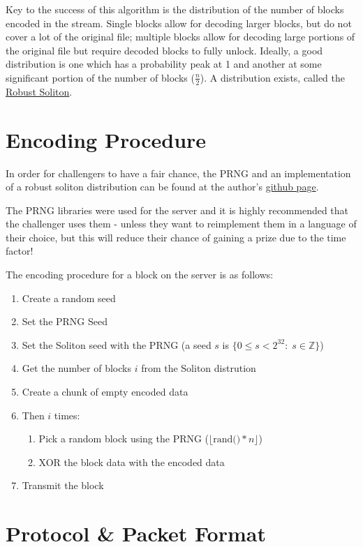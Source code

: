 \documentclass[10pt,a4paper]{article}
\begin{document}
Key to the success of this algorithm is the distribution of the number of blocks encoded in the stream.
Single blocks allow for decoding larger blocks, but do not cover a lot of the original file; multiple blocks allow for decoding large portions of the original file but require decoded blocks to fully unlock.
Ideally, a good distribution is one which has a probability peak at 1 and another at some significant portion of the number of blocks ($\frac{n}{2}$).
A distribution exists, called the \href{http://en.wikipedia.org/wiki/Soliton_distribution}{Robust Soliton}.

\section{Encoding Procedure}

In order for challengers to have a fair chance, the PRNG and an implementation of a robust soliton distribution can be found at the author's \href{http://github.com/carl-ellis/}{github page}.

The PRNG libraries were used for the server and it is highly recommended that the challenger uses them - unless they want to reimplement them in a language of their choice, but this will reduce their chance of gaining a prize due to the time factor!

The encoding procedure for a block on the server is as follows:

\begin{enumerate}
	\item Create a random seed
	\item Set the PRNG Seed
	\item Set the Soliton seed with the PRNG (a seed $s$ is $ \{ 0 \leq s < 2^{32} : \; s \in \mathbb{Z} \}$)
	\item Get the number of blocks $i$ from the Soliton distrution
	\item Create a chunk of empty encoded data
	\item Then $i$ times:
	\begin{enumerate}
		\item Pick a random block using the PRNG ($\lfloor \text{rand()}*n \rfloor$)
		\item XOR the block data with the encoded data
	\end{enumerate}
	\item Transmit the block 
\end{enumerate}


\section{Protocol \& Packet Format}
\end{document}
